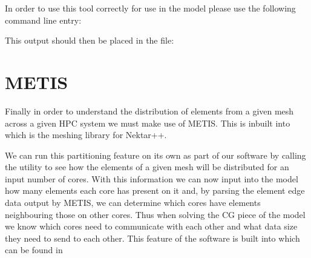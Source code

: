 In order to use this tool correctly for use in the model please use the following command line entry:


This output should then be placed in the file:


\section{METIS}
Finally in order to understand the distribution of elements from a given mesh across a given HPC system we must make use of METIS. This is inbuilt into  which is the meshing library for Nektar++.

We can run this partitioning feature on its own as part of our software by calling the  utility to see how the elements of a given mesh will be distributed for an input number of cores. With this information we can now input into the model how many elements each core has present on it and, by parsing the element edge data output by METIS, we can determine which cores have elements neighbouring those on other cores. Thus when solving the CG piece of the model we know which cores need to communicate with each other and what data size they need to send to each other. This feature of the software is built into  which can be found in 



